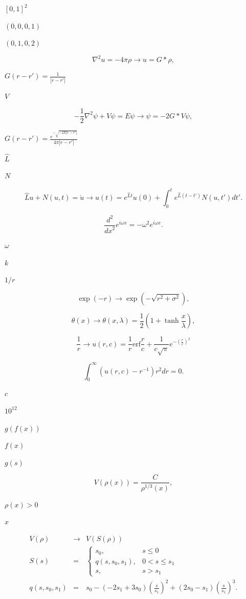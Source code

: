 \documentclass{article}
\begin{document}
$[0,1]^{2}$
\pagebreak

$(0,0,0,1)$
\pagebreak

$(0,1,0,2)$
\pagebreak

\[
\nabla^{2} u = -4\pi\rho \to u=G \ast \rho,
\]
\pagebreak

$G(r-r')=\frac{1}{|r-r'|}$
\pagebreak

$V$
\pagebreak

\[
- \frac{1}{2} \nabla^{2} \psi + V\psi = E \psi \to \psi = -2G \ast V\psi,
\]
\pagebreak

$G(r-r')=\frac{e^{-\sqrt{-2E|r-r'|}}}{4\pi |r-r'|} $
\pagebreak

$\hat{L}$
\pagebreak

$N$
\pagebreak

\[
\hat{L}u + N(u,t) = \dot{u} \to u(t) = e^{\hat{L} t} u(0) + \int _{0}^{t} e^{\hat{L} (t-t')} N(u,t') \mathit{d}t'.
\]
\pagebreak

\[
\frac{d^{2}}{\mathit{dx}^{2}}e^{i\omega x}=-\omega ^{2}e^{i\omega x}.
\]
\pagebreak

$\omega$
\pagebreak

$k$
\pagebreak

$1/r$
\pagebreak

\[
\exp(-r) \to \exp (-\sqrt{r^{2}+\sigma ^{2}}),
\]
\pagebreak

\[
\theta(x) \to \theta(x, \lambda) = \frac{1}{2} (1 + \tanh\frac{x}{\lambda}),
\]
\pagebreak

\[
\frac{1}{r} \to u(r,c) = \frac{1}{r} \mathrm{erf} \frac{r}{c} + \frac{1}{c\sqrt{\pi}} e^{-\left( \frac{r}{c} \right)^{2}}
\]
\pagebreak

\[
\int_{0}^{\infty} \left(u(r, c) - r^{-1}\right) r^{2} d\mathit{r} = 0.
\]
\pagebreak

$c$
\pagebreak

$10^{12}$
\pagebreak

$g(f(x))$
\pagebreak

$f(x)$
\pagebreak

$g(s)$
\pagebreak

\[
V(\rho(x)) = \frac{C}{\rho^{1/3}(x)},
\]
\pagebreak

$\rho (x)>0$
\pagebreak

$x$
\pagebreak

\begin{eqnarray*}
V(\rho) & \to & V(S(\rho)) \\
S(s) & = & \left\{ \begin{array}{ll} s_{0}, & s\le 0 \\ q(s, s_{0}, s_{1}), & 0 < s \le s_{1} \\ s, & s > s_{1} \end{array} \right. \\
q(s, s_{0}, s_{1}) & = & s_{0} - (-2s_{1} + 3s_{0}) \left( \frac{s}{s_{1}} \right)^{2} + (2s_{0} - s_{1}) \left(\frac{s}{s_{1}}\right)^{3}.
\end{eqnarray*}
\pagebreak
\end{document}
